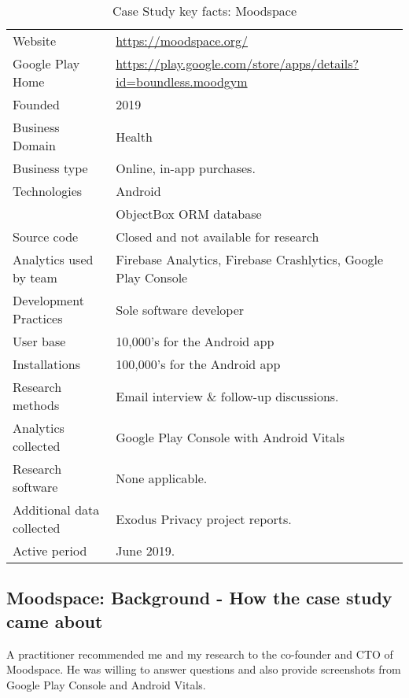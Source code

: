 {\renewcommand{\arraystretch}{0.8}%
\begin{table}[htbp!]
    \centering
    \small
    \setlength{\tabcolsep}{1pt}
    \begin{tabular}{lp{9cm}}
       \toprule
       Website &\url{https://moodspace.org/} \\
       Google Play Home & \url{https://play.google.com/store/apps/details?id=boundless.moodgym} \\
       Founded & 2019 \\
       Business Domain & Health \\
       Business type & Online, in-app purchases. \\
       Technologies  & Android \\
       & ObjectBox ORM database \\
       Source code  &Closed and not available for research \\
       Analytics used by team & Firebase Analytics, Firebase Crashlytics, Google Play Console \\
       Development Practices & Sole software developer \\
       \midrule
       User base & 10,000's for the Android app \\
       Installations & 100,000's for the Android app \\
       \midrule
       Research methods &Email interview \& follow-up discussions. \\
       Analytics collected &Google Play Console with Android Vitals \\
       Research software & None applicable. \\
       Additional data collected &Exodus Privacy project reports. \\
       Active period & June 2019. \\
       \bottomrule
    \end{tabular}
    \caption{Case Study key facts: Moodspace}
    \label{tab:blank_case_study_anaytics_overview}
\end{table}
}

\subsection{Moodspace: Background - How the case study came about}
A practitioner recommended me and my research to the co-founder and CTO of Moodspace. He was willing to answer questions and also provide screenshots from Google Play Console and Android Vitals.



